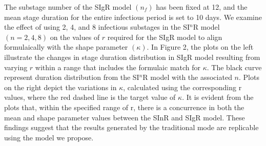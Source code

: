 \documentclass[12pt]{article}
\begin{document}
The substage number of the SIgR model $(n_f)$ has been fixed at 12, and the mean stage duration for the entire infectious period is set to 10 days. We examine the effect of using 2, 4, and 8 infectious substages in the SI$^n$R model $(n = 2, 4, 8)$ on the values of $r$ required for the SIgR model to align formulaically with the shape parameter $(\kappa)$. In Figure 2, the plots on the left illustrate the changes in stage duration distribution in SIgR model resulting from varying $r$ within a range that includes the formulaic match for $\kappa$. The black curve represent duration distribution from the SI$^n$R model with the associated $n$. Plots on the right depict the variations in $\kappa$, calculated using the corresponding r values, where the red dashed line is the target value of $\kappa$. It is evident from the plots that, within the specified range of r, there is a concurrence in both the mean and shape parameter values between the SInR and SIgR model. These findings suggest that the results generated by the traditional mode are replicable using the model we propose.
\end{document}
